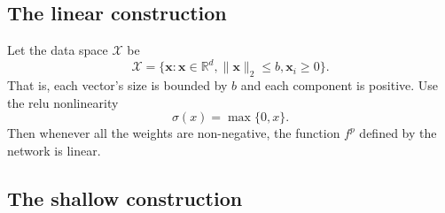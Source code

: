 \documentclass{article}
\newcommand{\R}{\mathbb{R}}
\newcommand{\ltwo}[1]{\lVert {#1} \rVert_2}
\newcommand{\set}{\mathcal}
\renewcommand{\vec}{\mathbf}
\begin{document}

\subsection{The linear construction}

Let the data space $\set X$ be 
\begin{equation}
    \set X = \{ \vec x : \vec x\in\R^d, \ltwo{\vec x} \le b, \vec x_i \ge 0\}
    .
\end{equation}
That is, each vector's size is bounded by $b$ and each component is positive.
Use the relu nonlinearity 
\begin{equation}
    \sigma(x) = \max\{0,x\}
    .
\end{equation}
Then whenever all the weights are non-negative,
the function $f^p$ defined by the network is linear.


\subsection{The shallow construction}
\end{document}
